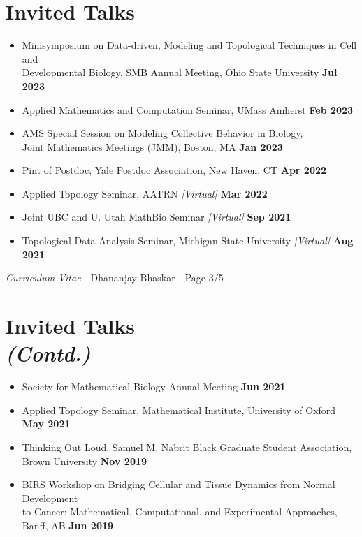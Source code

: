 \documentclass[margin,line]{res}
\begin{document}
\begin{resume}
\section{\sc Invited Talks}
{\renewcommand\leftmargini{0em}
\begin{itemize}
\setlength\itemsep{0.3em}
\item[] Minisymposium on Data-driven, Modeling and Topological Techniques in Cell and \\Developmental Biology, SMB Annual Meeting, Ohio State University \hfill {\bf Jul 2023}
\item[] Applied Mathematics and Computation Seminar, UMass Amherst \hfill {\bf Feb 2023}
\item[] AMS Special Session on Modeling Collective Behavior in Biology, \\Joint Mathematics Meetings (JMM), Boston, MA \hfill {\bf Jan 2023}
\item[] Pint of Postdoc, Yale Postdoc Association, New Haven, CT \hfill {\bf Apr 2022}
\item[] Applied Topology Seminar, AATRN \textit{[Virtual]} \hfill {\bf Mar 2022}
\item[] Joint UBC and U. Utah MathBio Seminar \textit{[Virtual]} \hfill {\bf Sep 2021}
\item[] Topological Data Analysis Seminar, Michigan State University \textit{[Virtual]} \hfill {\bf Aug 2021}
\end{itemize}
}

\newpage
\begin{flushright}
\textit{Curriculum Vitae} - Dhananjay Bhaskar - Page 3/5
\end{flushright}
\vspace*{.02cm}

\section{\sc Invited Talks \\ \textit{(Contd.)}}
{\renewcommand\leftmargini{0em}
\begin{itemize}
\setlength\itemsep{0.3em}

\item[] Society for Mathematical Biology Annual Meeting \hfill {\bf Jun 2021}
\item[] Applied Topology Seminar, Mathematical Institute, University of Oxford \hfill {\bf May 2021}
\item[] Thinking Out Loud, Samuel M. Nabrit Black Graduate Student Association, \\ Brown University \hfill {\bf Nov 2019}
\item[] BIRS Workshop on Bridging Cellular and Tissue Dynamics from Normal Development \\ to Cancer: Mathematical, Computational, and Experimental Approaches, Banff, AB \hfill {\bf Jun 2019} 


\end{itemize}}
\end{resume}
\end{document}
